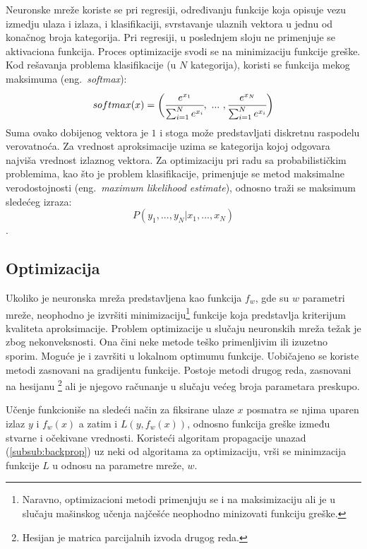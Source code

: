 Neuronske mreže koriste se pri regresiji, određivanju funkcije koja opisuje vezu izmedju ulaza i izlaza, i klasifikaciji, svrstavanje ulaznih vektora u jednu od konačnog broja kategorija. Pri regresiji, u poslednjem sloju ne primenjuje se aktivaciona funkcija. Proces optimizacije svodi se na minimizaciju funkcije greške. Kod rešavanja problema klasifikacije (u $N$ kategorija), koristi se funkcija mekog maksimuma (eng.~{\em softmax}):
\begin{equation}
	softmax(x) = \bigg( \cfrac{e^{x_1}}{\sum_{i=1}^{N} e^{x_i}}, ~...~, \cfrac{e^{x_N}}{\sum_{i=1}^{N} e^{x_i}} \bigg)
\end{equation}
Suma ovako dobijenog vektora je $1$ i stoga može predstavljati diskretnu raspodelu verovatnoća. Za vrednost aproksimacije uzima se kategorija kojoj odgovara najviša vrednost izlaznog vektora. Za optimizaciju pri radu sa probabilističkim problemima, kao što je problem klasifikacije, primenjuje se metod maksimalne verodostojnosti (eng.~{\em maximum likelihood estimate}), odnosno traži se maksimum sledećeg izraza: 
\begin{equation}
	P(y_1, ..., y_N | x_1, ..., x_N)
\end{equation}.

\subsection{Optimizacija}
\label{subsec:optimizacija}

Ukoliko je neuronska mreža predstavljena kao funkcija $f_w$, gde su $w$ parametri mreže, neophodno je izvršiti minimizaciju\footnote{Naravno, optimizacioni metodi primenjuju se i na maksimizaciju ali je u slučaju mašinskog učenja najčešće neophodno minizovati funkciju greške.} funkcije koja predstavlja kriterijum kvaliteta aproksimacije. Problem optimizacije u slučaju neuronskih mreža težak je zbog nekonveksnosti. Ona čini neke metode teško primenljivim ili izuzetno sporim. Moguće je i završiti u lokalnom optimumu funkcije. Uobičajeno se koriste metodi zasnovani na gradijentu funkcije. Postoje metodi drugog reda, zasnovani na hesijanu \footnote{Hesijan je matrica parcijalnih izvoda drugog reda.} ali je njegovo računanje u slučaju većeg broja parametara preskupo. \par
Učenje funkcioniše na sledeći način za fiksirane ulaze $x$ posmatra se njima uparen izlaz $y$ i $f_w(x)$ a zatim i $L(y, f_w(x))$, odnosno funkcija greške između stvarne i očekivane vrednosti. Koristeći algoritam propagacije unazad (\ref{subsub:backprop}) uz neki od algoritama za optimizaciju, vrši se minimzacija funkcije $L$ u odnosu na parametre mreže, $w$. 

